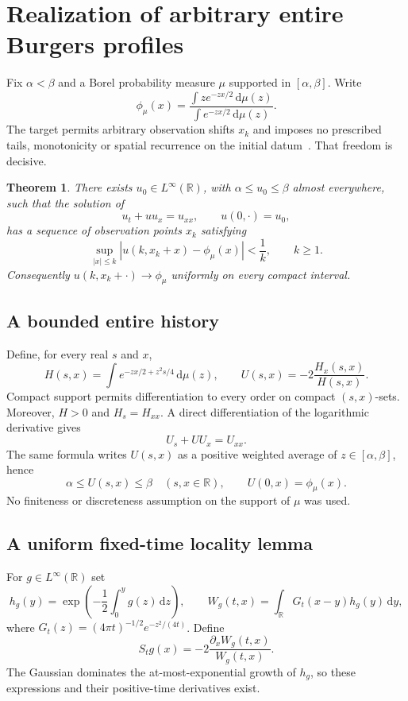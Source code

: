 \documentclass[11pt,a4paper]{article}
\numberwithin{equation}{section}
\newtheorem{theorem}{Theorem}[section]
\theoremstyle{remark}\newtheorem{remark}[theorem]{Remark}
\newcommand{\R}{\mathbb R}\newcommand{\C}{\mathbb C}\newcommand{\T}{\mathbb T}
\newcommand{\dd}{\,\mathrm d}
\begin{document}
\clearpage
\tableofcontents
\clearpage

\section{Realization of arbitrary entire Burgers profiles}\label{sec:burgers}

Fix $\alpha<\beta$ and a Borel probability measure $\mu$ supported in $[\alpha,\beta]$. Write
\begin{equation}\label{eq:profile}
 \phi_\mu(x)=\frac{\displaystyle\int z e^{-zx/2}\dd\mu(z)}
 {\displaystyle\int e^{-zx/2}\dd\mu(z)}.
\end{equation}
The target permits arbitrary observation shifts $x_k$ and imposes no prescribed tails, monotonicity or spatial recurrence on the initial datum~\cite{burgersentry,gs}. That freedom is decisive.

\begin{theorem}\label{thm:burgers}
There exists $u_0\in L^\infty(\R)$, with $\alpha\leq u_0\leq\beta$ almost everywhere, such that the solution of
\[
 u_t+u u_x=u_{xx},\qquad u(0,\cdot)=u_0,
\]
has a sequence of observation points $x_k$ satisfying
\[
 \sup_{|x|\leq k}|u(k,x_k+x)-\phi_\mu(x)|<\frac1k,
 \qquad k\geq1.
\]
Consequently $u(k,x_k+\cdot)\to\phi_\mu$ uniformly on every compact interval.
\end{theorem}

\subsection{A bounded entire history}
Define, for every real $s$ and $x$,
\begin{equation}\label{eq:entirehistory}
 H(s,x)=\int e^{-zx/2+z^2s/4}\dd\mu(z),\qquad
 U(s,x)=-2\frac{H_x(s,x)}{H(s,x)}.
\end{equation}
Compact support permits differentiation to every order on compact $(s,x)$-sets. Moreover, $H>0$ and $H_s=H_{xx}$. A direct differentiation of the logarithmic derivative gives
\[
 U_s+UU_x=U_{xx}.
\]
The same formula writes $U(s,x)$ as a positive weighted average of $z\in[\alpha,\beta]$, hence
\begin{equation}\label{eq:entirebounds}
 \alpha\leq U(s,x)\leq\beta \quad(s,x\in\R),
 \qquad U(0,x)=\phi_\mu(x).
\end{equation}
No finiteness or discreteness assumption on the support of $\mu$ was used.

\subsection{A uniform fixed-time locality lemma}
For $g\in L^\infty(\R)$ set
\[
 h_g(y)=\exp\left(-\frac12\int_0^y g(z)\dd z\right),\qquad
 W_g(t,x)=\int_\R G_t(x-y)h_g(y)\dd y,
\]
where $G_t(z)=(4\pi t)^{-1/2}e^{-z^2/(4t)}$. Define
\begin{equation}\label{eq:semigroup}
 S_tg(x)=-2\frac{\partial_xW_g(t,x)}{W_g(t,x)}.
\end{equation}
The Gaussian dominates the at-most-exponential growth of $h_g$, so these expressions and their positive-time derivatives exist.
\end{document}
